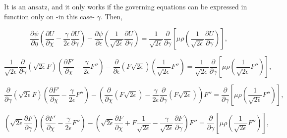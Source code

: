 It is an ansatz, and it only works if the governing equations
can be expressed in function only on -in this case- $\gamma$. 
Then,  

\begin{equation*} 
\frac{\partial \psi}{\partial \eta}
\left(
    \frac{\partial U}{\partial \chi}
    -
    \frac{\gamma}{2\epsilon}
    \frac{\partial U}{\partial \gamma}
\right)
-
\frac{\partial \psi}{\partial \epsilon}
\left(
    \frac{1}{\sqrt{2\epsilon}}
    \frac{\partial U}{\partial \gamma}
\right)
=
\frac{1}{\sqrt{2\epsilon}}
\frac{\partial}{\partial \gamma}
\left[
    \mu\rho
    \left(
    \frac{1}{\sqrt{2\epsilon}}
    \frac{\partial U}{\partial \gamma}
    \right)
\right]
,
\end{equation*} 

\begin{equation*} 
\frac{1}{\sqrt{2\epsilon}}
\frac{\partial }{\partial \gamma}
\left(
\sqrt{2\epsilon}
F
\right)
\left(
    \frac{\partial F'}{\partial \chi}
    -
    \frac{\gamma}{2\epsilon}
    F''
\right)
-
\frac{\partial }{\partial \epsilon}
\left(
        F \sqrt{2\epsilon}
     \right)
\left(
    \frac{1}{\sqrt{2\epsilon}}
    F''
     \right)
=
\frac{1}{\sqrt{2\epsilon}}
\frac{\partial}{\partial \gamma}
\left[
    \mu\rho
    \left(
    \frac{1}{\sqrt{2\epsilon}}
    F''
    \right)
\right]
,
\end{equation*} 

\begin{equation*} 
\frac{\partial }{\partial \gamma}
\left(
\sqrt{2\epsilon}
F
\right)
\left(
    \frac{\partial F'}{\partial \chi}
    -
    \frac{\gamma}{2\epsilon}
    F''
\right)
-
\left(
        \frac{\partial }{\partial \chi}
        \left(
        F \sqrt{2\epsilon}
        \right)
        -
        \frac{\gamma}{2\epsilon}
        \frac{\partial }{\partial \gamma}
        \left(
        F \sqrt{2\epsilon}
        \right)
\right)
F''
=
\frac{\partial}{\partial \gamma}
\left[
    \mu\rho
    \left(
    \frac{1}{\sqrt{2\epsilon}}
    F''
    \right)
\right]
,
\end{equation*} 

\begin{equation*} 
\left(
\sqrt{2\epsilon}
\frac{\partial F}{\partial \gamma}
\right)
\left(
    \frac{\partial F'}{\partial \chi}
    -
    \frac{\gamma}{2\epsilon}
    F''
\right)
-
\left(
        \sqrt{2\epsilon}
        \frac{\partial F }{\partial \chi}
        +
        F 
        \frac{1}{\sqrt{2\epsilon}}
        -
        \frac{\gamma}{\sqrt{2\epsilon}}
        \frac{\partial F}{\partial \gamma}
\right)
F''
=
\frac{\partial}{\partial \gamma}
\left[
    \mu\rho
    \left(
    \frac{1}{\sqrt{2\epsilon}}
    F''
    \right)
\right]
,
\end{equation*} 

